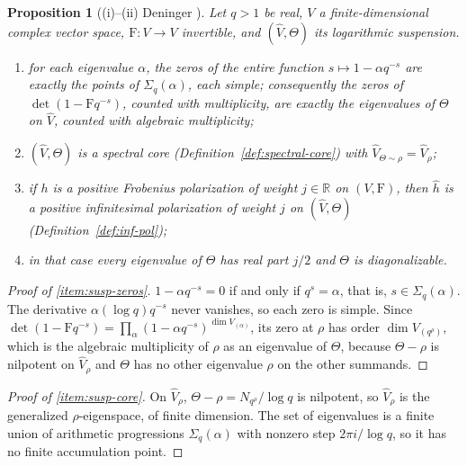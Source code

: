 \documentclass[11pt]{amsart}
\theoremstyle{plain}
\newtheorem{proposition}[theorem]{Proposition}
\theoremstyle{definition}
\theoremstyle{remark}
\numberwithin{equation}{section}
\newcommand{\R}{\mathbb{R}}
\begin{document}
\begin{proposition}[{(i)--(ii) Deninger
\cite[Corollary~(2.8), p.~10, and~(4.1), p.~16]{Deninger1994Motivic}}]%
\label{prop:suspension}
Let $q>1$ be real, $V$ a finite-dimensional complex vector space,
$\mathrm{F}:V\to V$ invertible, and $(\widehat V,\Theta)$ its
logarithmic suspension.
\begin{enumerate}[label=(\roman*)]
\item\label{item:susp-zeros} for each eigenvalue $\alpha$, the zeros of
  the entire function $s\mapsto1-\alpha q^{-s}$ are exactly the points
  of $\Sigma_q(\alpha)$, each simple; consequently the zeros of
  $\det(1-\mathrm{F}q^{-s})$, counted with multiplicity, are exactly the
  eigenvalues of $\Theta$ on $\widehat V$, counted with algebraic
  multiplicity;
\item\label{item:susp-core} $(\widehat V,\Theta)$ is a spectral core
  (Definition~\ref{def:spectral-core}) with $\widehat
  V_{\Theta\sim\rho}=\widehat V_\rho$;
\item\label{item:susp-pol} if $h$ is a positive Frobenius polarization
  of weight $j\in\R$ on $(V,\mathrm{F})$, then $\widehat h$ is a positive
  infinitesimal polarization of weight $j$ on $(\widehat V,\Theta)$
  (Definition~\ref{def:inf-pol});
\item\label{item:susp-line} in that case every eigenvalue of $\Theta$
  has real part $j/2$ and $\Theta$ is diagonalizable.
\end{enumerate}
\end{proposition}

\begin{proof}[Proof of \ref{item:susp-zeros}]
$1-\alpha q^{-s}=0$ if and only if $q^s=\alpha$, that is,
$s\in\Sigma_q(\alpha)$. The derivative $\alpha(\log q)q^{-s}$ never
vanishes, so each zero is simple. Since
$\det(1-\mathrm{F}q^{-s})=\prod_\alpha(1-\alpha q^{-s})^{\dim
V_{(\alpha)}}$, its zero at $\rho$ has order $\dim V_{(q^\rho)}$, which
is the algebraic multiplicity of $\rho$ as an eigenvalue of $\Theta$,
because $\Theta-\rho$ is nilpotent on $\widehat V_\rho$ and $\Theta$ has
no other eigenvalue $\rho$ on the other summands.
\end{proof}

\begin{proof}[Proof of \ref{item:susp-core}]
On $\widehat V_\rho$, $\Theta-\rho=N_{q^\rho}/\log q$ is nilpotent, so
$\widehat V_\rho$ is the generalized $\rho$-eigenspace, of finite
dimension. The set of eigenvalues is a finite union of arithmetic
progressions $\Sigma_q(\alpha)$ with nonzero step $2\pi i/\log q$, so it
has no finite accumulation point.
\end{proof}
\end{document}
